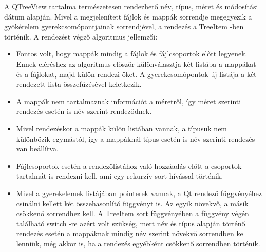 A {\ttfamily QTreeView} tartalma természetesen rendezhető név, típus, méret 
és módosítási dátum alapján. 
Mivel a megjelenített fájlok és mappák sorrendje megegyezik 
a gyökérelem gyerekcsomópontjainak sorrendjével, 
a rendezés a {\ttfamily TreeItem} -ben történik. 
\newline
A rendezést végző algoritmus jellemzői:
\begin{itemize}
\item
Fontos volt, hogy mappák mindig a fájlok és fájlcsoportok előtt legyenek. 
Ennek eléréshez az algoritmus először különválasztja két listába 
a mappákat és a fájlokat, majd külön rendezi őket. 
A gyerekcsomópontok új listája a két rendezett lista összefűzésével keletkezik. 
\item
A mappák nem tartalmaznak információt a méretről, 
így méret szerinti rendezés esetén is név szerint rendeződnek. 
\item
Mivel rendezéskor a mappák külön listában vannak, 
a típusuk nem különbözik egymástól, 
így a mappáknál típus esetén is név szerinti rendezés van beállítva.
\item
Fájlcsoportok esetén a rendezőlistához való hozzáadás előtt 
a csoportok tartalmát is rendezni kell, 
ami egy rekurzív {\ttfamily sort} hívással történik.
\item
Mivel a gyerekelemek listájában pointerek vannak, 
a Qt rendező függvényéhez csinálni kellett két összehasonlító függvényt is. 
Az egyik növekvő, a másik csökkenő sorrendhez kell. 
A {\ttfamily TreeItem} {\ttfamily sort}
függvényében a függvény végén 
található switch -re azért volt szükség, 
mert név és típus alapján történő rendezés esetén 
a mappáknak mindig név szerint növekvő sorrendben kell lenniük,
még akkor is, ha a rendezés egyébként csökkenő sorrendben történik.
\end{itemize}
